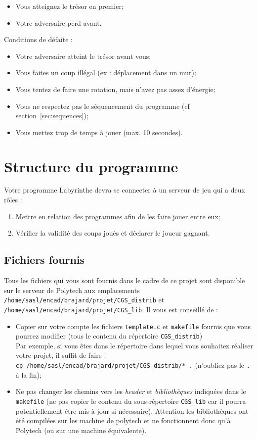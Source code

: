 \documentclass[french,12pt,a4paper,twoside,openright,titlepage]{report}
\begin{document}
\begin{itemize}
\item Vous atteignez le trésor en premier;
\item Votre adversaire perd avant.
\end{itemize}

Conditions de défaite :
\begin{itemize}
\item Votre adversaire atteint le trésor avant vous;
\item Vous faites un coup illégal (ex : déplacement dans un mur);
\item Vous tentez de faire une rotation, mais n'avez pas assez d'énergie;
\item Vous ne respectez pas le séquencement du programme (cf section~\ref{sec:sequences});
\item Vous mettez trop de temps à jouer (max. 10 secondes).
\end{itemize}


\section{Structure du programme}
Votre programme Labyrinthe devra se connecter à un serveur de jeu qui a deux rôles :
\begin{enumerate}
\item Mettre en relation des programmes afin de les faire jouer entre eux;
\item Vérifier la validité des coups joués et déclarer le joueur gagnant.
\end{enumerate}

\subsection{Fichiers fournis}
\label{sec:fourni}
Tous les fichiers qui vous sont fournis dans le cadre de ce projet sont disponible sur le serveur de Polytech
aux emplacements \verb|/home/sasl/encad/brajard/projet/CGS_distrib| et \verb|/home/sasl/encad/brajard/projet/CGS_lib|.
Il vous est conseillé de :
\begin{itemize}
\item Copier sur votre compte les fichiers \verb|template.c| et \verb|makefile| fournis que vous pourrez modifier (tous le contenu du répertoire \verb|CGS_distrib|)\\
Par exemple, si vous êtes dans le répertoire dans lequel vous souhaitez réaliser votre projet, il suffit de faire :\\
\verb|cp /home/sasl/encad/brajard/projet/CGS_distrib/* .|
(n'oubliez pas le \verb|.| à la fin);
\item Ne pas changer les chemins vers les \textit{header} et \textit{bibliothèques}  indiquées dans le \verb|makefile| (ne pas copier le contenu du sous-répertoire \verb|CGS_lib| car il pourra potentiellement être mis à jour si nécessaire). Attention les bibliothèques ont été compilées sur les machine de polytech et ne fonctionnent donc qu'à Polytech (ou sur une machine équivalente).
\end{itemize}
\end{document}
